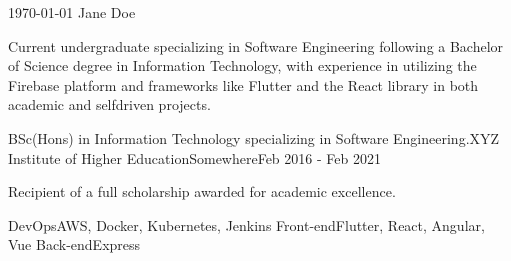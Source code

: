 \documentclass[11pt, a4paper]{awesome-cv}
\begin{document}
\makecvheader[C]

\makecvfooter
  {\today}
  {Jane Doe}
  {\thepage}


        \begin{cvparagraph}

        Current undergraduate specializing in Software Engineering following a Bachelor of Science degree in Information Technology, with experience in utilizing the Firebase platform and frameworks like Flutter and the React library in both academic and selfdriven projects.
        \end{cvparagraph}

        

        \begin{cventries}

        
                  \cventry
                {BSc(Hons) in Information Technology specializing in Software Engineering.}{XYZ Institute of Higher Education}{Somewhere}{Feb 2016 - Feb 2021}
                        {
                          \begin{cvitems}
                            \item{Recipient of a full scholarship awarded for academic excellence.}
                          \end{cvitems}
                        }
        \end{cventries}

        

        \begin{cvskills}

        
                  \cvskill
                {DevOps}{AWS, Docker, Kubernetes, Jenkins}
                  \cvskill
                {Front-end}{Flutter, React, Angular, Vue}
                  \cvskill
                {Back-end}{Express}
        \end{cvskills}

        
\end{document}
